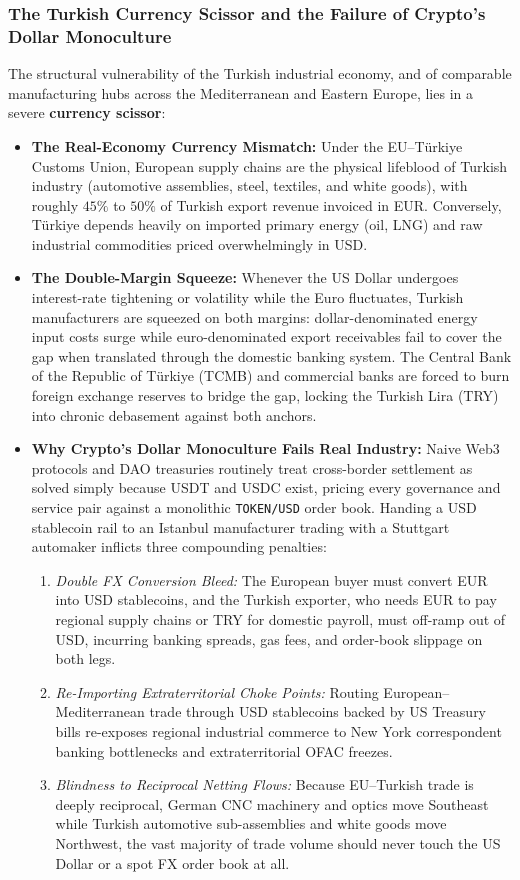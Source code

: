 \documentclass[a4paper,11pt,twoside,parskip=half-,headings=small]{scrartcl}
\newcommand{\code}[1]{\texttt{#1}}
\begin{document}
\subsubsection{The Turkish Currency Scissor and the Failure of Crypto's Dollar Monoculture}
The structural vulnerability of the Turkish industrial economy, and of comparable manufacturing hubs across the Mediterranean and Eastern Europe, lies in a severe \textbf{currency scissor}:
\begin{itemize}[nosep]
  \item \textbf{The Real-Economy Currency Mismatch:} Under the EU--T\"urkiye Customs Union, European supply chains are the physical lifeblood of Turkish industry (automotive assemblies, steel, textiles, and white goods), with roughly $45\%$ to $50\%$ of Turkish export revenue invoiced in EUR. Conversely, T\"urkiye depends heavily on imported primary energy (oil, LNG) and raw industrial commodities priced overwhelmingly in USD.
  \item \textbf{The Double-Margin Squeeze:} Whenever the US Dollar undergoes interest-rate tightening or volatility while the Euro fluctuates, Turkish manufacturers are squeezed on both margins: dollar-denominated energy input costs surge while euro-denominated export receivables fail to cover the gap when translated through the domestic banking system. The Central Bank of the Republic of T\"urkiye (TCMB) and commercial banks are forced to burn foreign exchange reserves to bridge the gap, locking the Turkish Lira (TRY) into chronic debasement against both anchors.
  \item \textbf{Why Crypto's Dollar Monoculture Fails Real Industry:} Naive Web3 protocols and DAO treasuries routinely treat cross-border settlement as solved simply because USDT and USDC exist, pricing every governance and service pair against a monolithic \code{TOKEN/USD} order book. Handing a USD stablecoin rail to an Istanbul manufacturer trading with a Stuttgart automaker inflicts three compounding penalties:
  \begin{enumerate}[label=(\alph*),nosep]
    \item \emph{Double FX Conversion Bleed:} The European buyer must convert EUR into USD stablecoins, and the Turkish exporter, who needs EUR to pay regional supply chains or TRY for domestic payroll, must off-ramp out of USD, incurring banking spreads, gas fees, and order-book slippage on both legs.
    \item \emph{Re-Importing Extraterritorial Choke Points:} Routing European--Mediterranean trade through USD stablecoins backed by US Treasury bills re-exposes regional industrial commerce to New York correspondent banking bottlenecks and extraterritorial OFAC freezes.
    \item \emph{Blindness to Reciprocal Netting Flows:} Because EU--Turkish trade is deeply reciprocal, German CNC machinery and optics move Southeast while Turkish automotive sub-assemblies and white goods move Northwest, the vast majority of trade volume should never touch the US Dollar or a spot FX order book at all.
  \end{enumerate}
\end{itemize}
\end{document}
